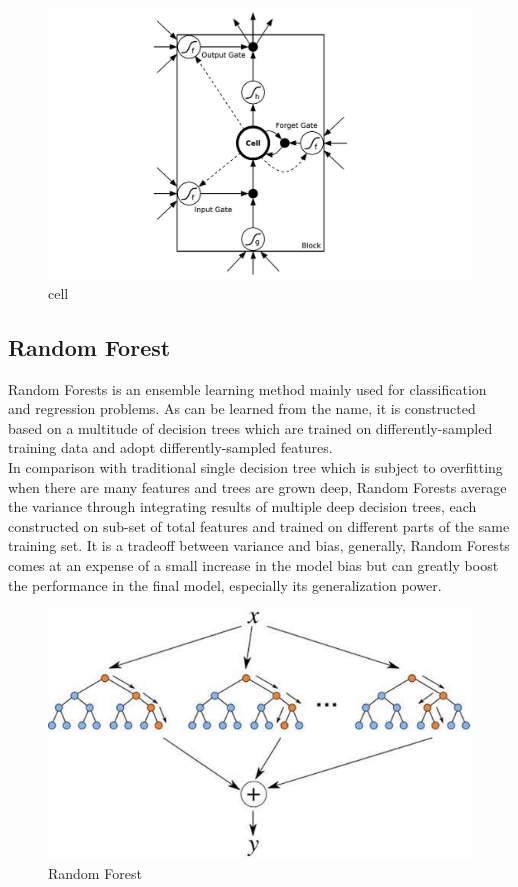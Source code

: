 \documentclass[10pt, conference, compsocconf]{IEEEtran}
\begin{document}
\begin{figure}[ht]
	\centering
	\includegraphics[scale=0.3]{2.png}
	\caption{cell} \label{fig 2}
\end{figure}

\subsection{Random Forest}
Random Forests is an ensemble learning method mainly used for classification and regression problems. As can be learned from the name, it is 
constructed based on a multitude of decision trees which are trained on differently-sampled training data and adopt differently-sampled features. \\
In comparison with traditional single decision tree which is subject to overfitting when there are many features and trees are grown deep, 
Random Forests average the variance through integrating results of multiple deep decision trees, each constructed on sub-set of total features 
and trained on different parts of the same training set. It is a tradeoff between variance and bias, generally, Random Forests comes at an expense of a small increase in the 
model bias but can greatly boost the performance in the final model, especially its generalization power.\\

\begin{figure}[ht]
	\centering
	\includegraphics[scale=0.5]{3.png}
	\caption{Random Forest} \label{fig 3}
\end{figure}
\end{document}
